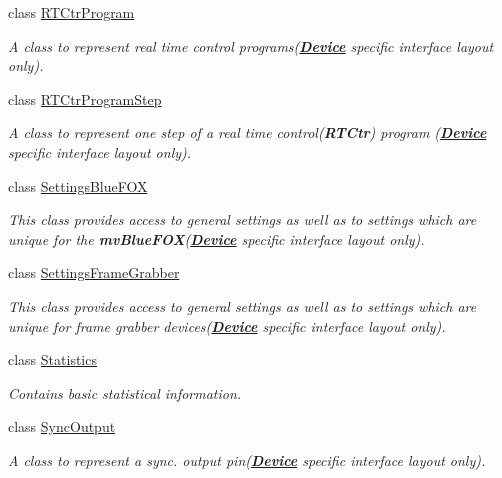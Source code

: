 \begin{DoxyCompactItemize}
class \hyperlink{classmv_i_m_p_a_c_t_1_1acquire_1_1_r_t_ctr_program}{R\+T\+Ctr\+Program}
\begin{DoxyCompactList}\small\item\em A class to represent real time control programs({\bfseries \hyperlink{classmv_i_m_p_a_c_t_1_1acquire_1_1_device}{Device}} specific interface layout only). \end{DoxyCompactList}\item 
class \hyperlink{classmv_i_m_p_a_c_t_1_1acquire_1_1_r_t_ctr_program_step}{R\+T\+Ctr\+Program\+Step}
\begin{DoxyCompactList}\small\item\em A class to represent one step of a real time control({\bfseries R\+T\+Ctr}) program ({\bfseries \hyperlink{classmv_i_m_p_a_c_t_1_1acquire_1_1_device}{Device}} specific interface layout only). \end{DoxyCompactList}\item 
class \hyperlink{classmv_i_m_p_a_c_t_1_1acquire_1_1_settings_blue_f_o_x}{Settings\+Blue\+F\+O\+X}
\begin{DoxyCompactList}\small\item\em This class provides access to general settings as well as to settings which are unique for the {\bfseries mv\+Blue\+F\+O\+X}({\bfseries \hyperlink{classmv_i_m_p_a_c_t_1_1acquire_1_1_device}{Device}} specific interface layout only). \end{DoxyCompactList}\item 
class \hyperlink{classmv_i_m_p_a_c_t_1_1acquire_1_1_settings_frame_grabber}{Settings\+Frame\+Grabber}
\begin{DoxyCompactList}\small\item\em This class provides access to general settings as well as to settings which are unique for frame grabber devices({\bfseries \hyperlink{classmv_i_m_p_a_c_t_1_1acquire_1_1_device}{Device}} specific interface layout only). \end{DoxyCompactList}\item 
class \hyperlink{classmv_i_m_p_a_c_t_1_1acquire_1_1_statistics}{Statistics}
\begin{DoxyCompactList}\small\item\em Contains basic statistical information. \end{DoxyCompactList}\item 
class \hyperlink{classmv_i_m_p_a_c_t_1_1acquire_1_1_sync_output}{Sync\+Output}
\begin{DoxyCompactList}\small\item\em A class to represent a sync. output pin({\bfseries \hyperlink{classmv_i_m_p_a_c_t_1_1acquire_1_1_device}{Device}} specific interface layout only). \end{DoxyCompactList}\item 

\end{DoxyCompactItemize}
